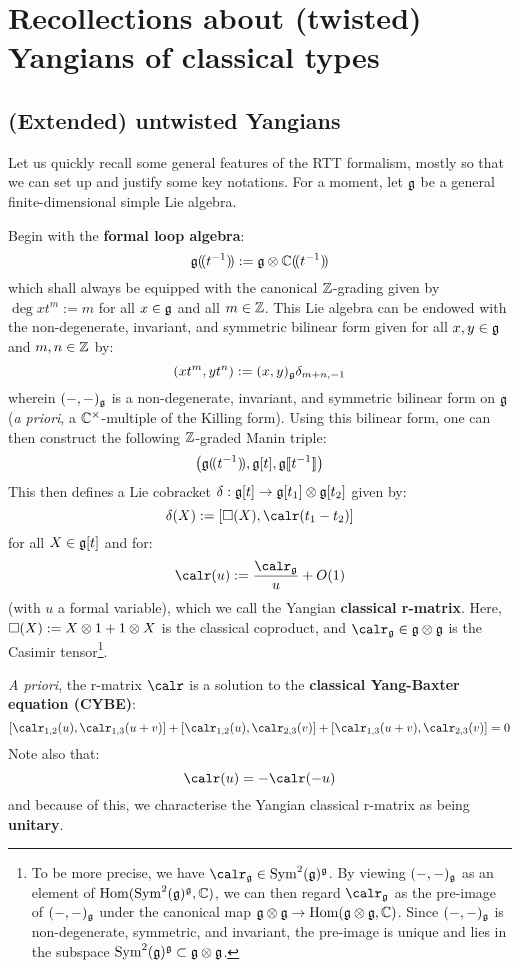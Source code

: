 \section{Recollections about (twisted) Yangians of classical types}
    \subsection{(Extended) untwisted Yangians}
        Let us quickly recall some general features of the RTT formalism, mostly so that we can set up and justify some key notations. For a moment, let $\mathfrak{g}$ be a general finite-dimensional simple Lie algebra.
            
        Begin with the \textbf{formal loop algebra}:
            $$\g(\!(t^{-1})\!) := \g \tensor \bbC(\!(t^{-1})\!)$$
        which shall always be equipped with the canonical $\mathbb{Z}$-grading given by $\deg xt^m := m$ for all $x \in \mathfrak{g}$ and all $m \in \mathbb{Z}$. This Lie algebra can be endowed with the non-degenerate, invariant, and symmetric bilinear form given for all $x, y \in \mathfrak{g}$ and $m, n \in \mathbb{Z}$ by:
            $$(xt^m, yt^n) := (x, y)_{\mathfrak{g}} \delta_{m + n, -1}$$
        wherein $(-, -)_{\mathfrak{g}}$ is a non-degenerate, invariant, and symmetric bilinear form on $\mathfrak{g}$ (\textit{a priori}, a $\bbC^{\x}$-multiple of the Killing form). Using this bilinear form, one can then construct the following $\mathbb{Z}$-graded Manin triple:
            $$\left( \mathfrak{g}(\!(t^{-1})\!), \mathfrak{g}[t], \mathfrak{g}[\![t^{-1}]\!] \right)$$
        This then defines a Lie cobracket $\delta: \g[t] \to \g[t_1] \tensor \g[t_2]$ given by:
            $$\delta( X ) := [\Box(X), \calr(t_1 - t_2)]$$
        for all $X \in \mathfrak{g}[t]$ and for:
            $$\calr(u) := \frac{\calr_{\g}}{u} + O(1)$$
        (with $u$ a formal variable), which we call the Yangian \textbf{classical r-matrix}. Here, $\Box(X) := X \tensor 1 + 1 \tensor X$ is the  classical coproduct, and $\calr_{\g} \in \g \tensor \g$ is the Casimir tensor\footnote{To be more precise, we have $\calr_{\g} \in \Sym^2(\g)^{\g}$. By viewing $(-, -)_{\mathfrak{g}}$ as an element of $\operatorname{Hom}( \operatorname{Sym}^2(\mathfrak{g})^{\mathfrak{g}}, \mathbb{C} )$, we can then regard $\calr_{\g}$ as the pre-image of $(-, -)_{\mathfrak{g}}$ under the canonical map $\g \tensor \g \to \Hom(\g \tensor \g, \bbC)$. Since $(-, -)_{\mathfrak{g}}$ is non-degenerate, symmetric, and invariant, the pre-image is unique and lies in the subspace $\Sym^2(\g)^{\g} \subset \g \tensor \g$.}.
        
        \textit{A priori}, the r-matrix $\calr$ is a solution to the \textbf{classical Yang-Baxter equation (CYBE)}:
            \begin{equation} \label{equation: CYBE}
                [\calr_{1, 2}(u), \calr_{1, 3}(u + v)] + [\calr_{1, 2}(u), \calr_{2, 3}(v)] + [\calr_{1, 3}(u + v), \calr_{2, 3}(v)] = 0
            \end{equation}
        Note also that:
            \begin{equation} \label{equation: classical_unitarity}
                \calr(u) = -\calr(-u)
            \end{equation}
        and because of this, we characterise the Yangian classical r-matrix as being \textbf{unitary}.
        

